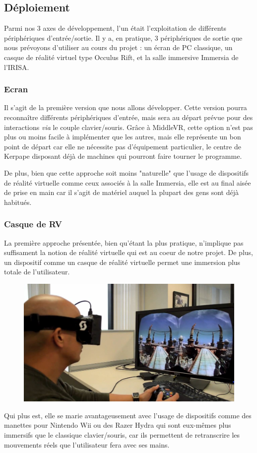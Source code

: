 \subsection{Déploiement}
Parmi nos 3 axes de développement, l'un était l'exploitation de différents périphériques d'entrée/sortie. Il y a, en pratique, 3 périphériques de sortie que nous prévoyons d'utiliser au cours du projet : un écran de PC classique, un casque de réalité virtuel type Occulus Rift, et la salle immersive Immersia de l'IRISA. 

\subsubsection{Ecran}
Il s'agit de la première version que nous allons développer. Cette version pourra reconnaître différents périphériques d'entrée, mais sera au départ prévue pour des interactions \textit{via} le couple clavier/souris. Grâce à MiddleVR, cette option n'est pas plus ou moins facile à implémenter que les autres, mais elle représente un bon point de départ car elle ne nécessite pas d'équipement particulier, le centre de Kerpape disposant déjà de machines qui pourront faire tourner le programme. \newline

De  plus, bien que cette approche soit moins "naturelle" que l'usage de dispositifs de réalité virtuelle comme ceux associés à la salle Immersia, elle est au final aisée de prise en main car il s'agit de matériel auquel la plupart des gens sont déjà habitués. 

\subsubsection{Casque de RV}
La première approche présentée, bien qu'étant la plus pratique, n'implique pas suffisament la notion de réalité virtuelle qui est au coeur de notre projet. De plus, un dispositif comme un casque de réalité virtuelle permet une immersion plus totale de l'utilisateur. 
\begin{figure}
	\centering
	\includegraphics[scale=0.3]{2-Specifications/img-utilisateur/occulus.jpg}
\end{figure}
Qui plus est, elle se marie avantageusement avec l'usage de dispositifs comme des manettes pour Nintendo Wii ou des Razer Hydra qui sont eux-mêmes plus immersifs que le classique clavier/souris, car ils permettent de retranscrire les mouvements réels que l'utilisateur fera avec ses mains. \newline

